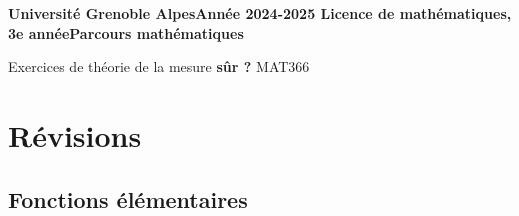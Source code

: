 \documentclass[11pt,a4paper]{article}
\newcommand{\rk}[1]{\textbf{\color{red}#1}}
\begin{document}
	
	{\bfseries
		\noindent Université Grenoble Alpes\hfill Année 2024-2025\break
		Licence de mathématiques, 3e année\hfill \break  Parcours mathématiques \hfill\break
		
		\vskip 5pt
		\centerline{\LARGE{Exercices de théorie de la mesure \rk{sûr ?} MAT366}}
		
	}
	\vskip5mm
	
	\tableofcontents

\newpage \section{Révisions}


\subsection{Fonctions élémentaires}
\end{document}

